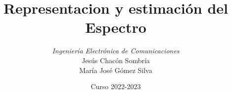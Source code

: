 \documentclass[handout]{beamer}
\title[Procesamiento de Señales]{Representacion y estimación del Espectro}
\author[Jesús Chacón Sombría]{%
\textit{Ingeniería Electrónica de Comunicaciones }\\
\vspace{0.6cm}
\small Jesús Chacón Sombría \\
\small María José Gómez Silva}
\institute[DACYA. UCM] {%
	\footnotesize  Departamento de Arquitectura de Computadores y Automática\\
  Universidad Complutense de Madrid
}
\date[Estimación del espectro] %
{\footnotesize Curso 2022-2023 }%
\newcommand{\MyLogo}{%
\begin{textblock}{14}(116.0,0.6)
  \pgfuseimage{logo}
\end{textblock}
}
\numberwithin{section}{part}
\begin{document}
\begin{frame}
  \titlepage
\end{frame}

\newcommand*\oldmacro{}%
\let\oldmacro\insertshorttitle%
\renewcommand*\insertshorttitle{%
	\MyLogo
\oldmacro\hfill%
}




\end{document}
